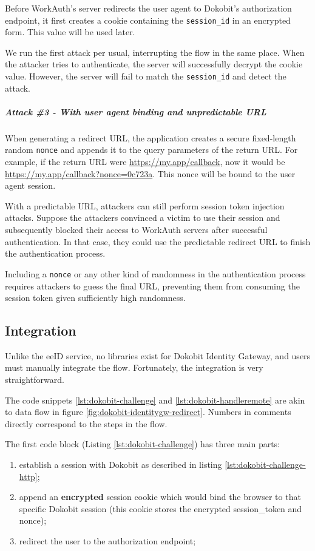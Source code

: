 Before WorkAuth's server redirects the user agent to Dokobit's authorization endpoint, it first creates a cookie containing the \texttt{session\_id} in an encrypted form. This value will be used later.

We run the first attack per usual, interrupting the flow in the same place. When the attacker tries to authenticate, the server will successfully decrypt the cookie value. However, the server will fail to match the \texttt{session\_id} and detect the attack.

\subparagraph{Attack \#3 - With user agent binding and unpredictable URL}

When generating a redirect URL, the application creates a secure fixed-length random \texttt{nonce} and appends it to the query parameters of the return URL. For example, if the return URL were \url{https://my.app/callback}, now it would be \url{https://my.app/callback?nonce=0c723a}. This nonce will be bound to the user agent session.

With a predictable URL, attackers can still perform session token injection attacks. Suppose the attackers convinced a victim to use their session and subsequently blocked their access to WorkAuth servers after successful authentication. In that case, they could use the predictable redirect URL to finish the authentication process.

Including a \texttt{nonce} or any other kind of randomness in the authentication process requires attackers to guess the final URL, preventing them from consuming the session token given sufficiently high randomness.

\subsection{Integration}

Unlike the eeID service, no libraries exist for Dokobit Identity Gateway, and users must manually integrate the flow. Fortunately, the integration is very straightforward.

The code snippets \ref{lst:dokobit-challenge} and \ref{lst:dokobit-handleremote} are akin to data flow in figure \ref{fig:dokobit-identitygw-redirect}. Numbers in comments directly correspond to the steps in the flow.

The first code block (Listing \ref{lst:dokobit-challenge}) has three main parts:

\begin{enumerate}
  \item establish a session with Dokobit as described in listing \ref{lst:dokobit-challenge-http};
  \item append an \textbf{encrypted} session cookie which would bind the browser to that specific Dokobit session (this cookie stores the encrypted session\_token and nonce);
  \item redirect the user to the authorization endpoint;
\end{enumerate}

